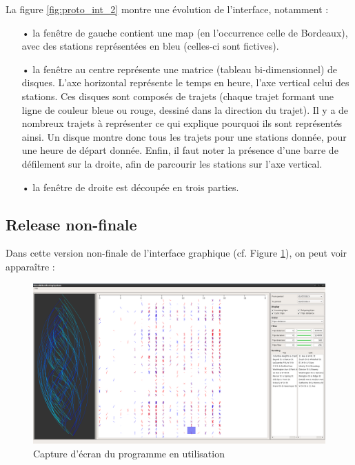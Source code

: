 \documentclass[12pt]{article}
\begin{document}
		La figure \ref{fig:proto_int_2} montre une évolution de l’interface, notamment :\\
		\begin{itemize}
		\item[•] la fenêtre de gauche contient une map (en l'occurrence celle de Bordeaux), avec des stations représentées en bleu (celles-ci sont fictives).
		\item[•] la fenêtre au centre représente une matrice (tableau bi-dimensionnel) de disques. L’axe horizontal représente le temps en heure, l’axe vertical celui des stations. Ces disques sont composés de trajets (chaque trajet formant une ligne de couleur bleue ou rouge, dessiné dans la direction du trajet). Il y a de nombreux trajets à représenter ce qui explique pourquoi ils sont représentés ainsi. Un disque montre donc tous les trajets pour une stations donnée, pour une heure de départ donnée. Enfin, il faut noter la présence d’une barre de défilement sur la droite, afin de parcourir les stations sur l’axe vertical.
		\item[•] la fenêtre de droite est découpée en trois parties.
		\end{itemize}
		
		
		\subsection{Release non-finale}
		
		Dans cette version non-finale de l’interface graphique (cf. Figure \ref{fig:screen_final_1}), on peut voir apparaître : \\
		
		\begin{figure}[!h]
		\begin{center}
		\includegraphics[scale=.25]{screen_final_1.png}
		\caption{Capture d’écran du programme en utilisation}
		\label{fig:screen_final_1}
		\end{center}
		\end{figure}
		
\end{document}
